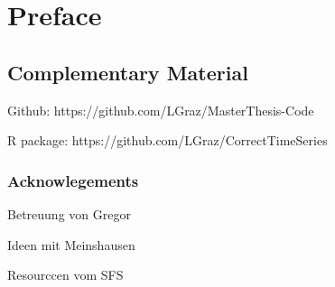 \chapter*{Preface}
\section*{Complementary Material}


Github: https://github.com/LGraz/MasterThesis-Code

R package: https://github.com/LGraz/CorrectTimeSeries 


\subsection*{Acknowlegements}
Betreuung von Gregor

Ideen mit Meinshausen

Resourccen vom SFS

